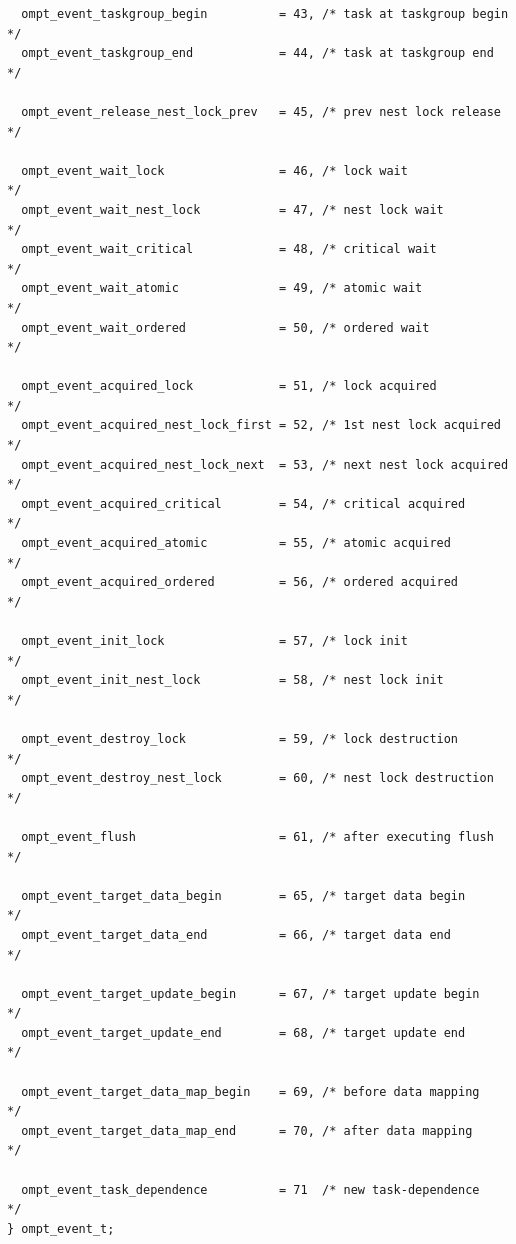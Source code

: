 \documentclass{article}
\begin{document}
{\begin{verbatim}
  ompt_event_taskgroup_begin          = 43, /* task at taskgroup begin    */
  ompt_event_taskgroup_end            = 44, /* task at taskgroup end      */

  ompt_event_release_nest_lock_prev   = 45, /* prev nest lock release     */
								    
  ompt_event_wait_lock                = 46, /* lock wait                  */
  ompt_event_wait_nest_lock           = 47, /* nest lock wait             */
  ompt_event_wait_critical            = 48, /* critical wait              */
  ompt_event_wait_atomic              = 49, /* atomic wait                */
  ompt_event_wait_ordered             = 50, /* ordered wait               */
		 	            				    	    
  ompt_event_acquired_lock            = 51, /* lock acquired              */
  ompt_event_acquired_nest_lock_first = 52, /* 1st nest lock acquired     */
  ompt_event_acquired_nest_lock_next  = 53, /* next nest lock acquired    */
  ompt_event_acquired_critical        = 54, /* critical acquired          */
  ompt_event_acquired_atomic          = 55, /* atomic acquired            */
  ompt_event_acquired_ordered         = 56, /* ordered acquired           */
			            				    	    
  ompt_event_init_lock                = 57, /* lock init                  */
  ompt_event_init_nest_lock           = 58, /* nest lock init             */
  
  ompt_event_destroy_lock             = 59, /* lock destruction           */
  ompt_event_destroy_nest_lock        = 60, /* nest lock destruction      */
			            	 			         
  ompt_event_flush                    = 61, /* after executing flush      */ 

  ompt_event_target_data_begin        = 65, /* target data begin          */
  ompt_event_target_data_end          = 66, /* target data end            */

  ompt_event_target_update_begin      = 67, /* target update begin        */
  ompt_event_target_update_end        = 68, /* target update end          */

  ompt_event_target_data_map_begin    = 69, /* before data mapping        */
  ompt_event_target_data_map_end      = 70, /* after data mapping         */
  
  ompt_event_task_dependence          = 71  /* new task-dependence        */
} ompt_event_t;
\end{verbatim}

}
\end{document}
